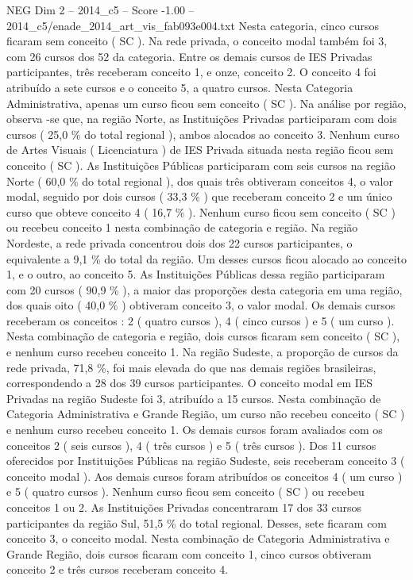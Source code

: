 \begin{textsample}{NEG Dim 2 – 2014\_c5 – Score -1.00 – 2014\_c5/enade\_2014\_art\_vis\_fab093e004.txt}
Nesta categoria, cinco cursos ficaram sem conceito ( SC ).
Na rede privada, o conceito modal também foi 3, com 26 cursos dos 52 da categoria.
Entre os demais cursos de IES Privadas participantes, três receberam conceito 1, e onze, conceito 2.
O conceito 4 foi atribuído a sete cursos e o conceito 5, a quatro cursos.
Nesta Categoria Administrativa, apenas um curso ficou sem conceito ( SC ).
Na análise por região, observa -se que, na região Norte, as Instituições Privadas participaram com dois cursos ( 25,0 \% do total regional ), ambos alocados ao conceito 3.
Nenhum curso de Artes Visuais ( Licenciatura ) de IES Privada situada nesta região ficou sem conceito ( SC ).
As Instituições Públicas participaram com seis cursos na região Norte ( 60,0 \% do total regional ), dos quais três obtiveram conceitos 4, o valor modal, seguido por dois cursos ( 33,3 \% ) que receberam conceito 2 e um único curso que obteve conceito 4 ( 16,7 \% ).
Nenhum curso ficou sem conceito ( SC ) ou recebeu conceito 1 nesta combinação de categoria e região.
Na região Nordeste, a rede privada concentrou dois dos 22 cursos participantes, o equivalente a 9,1 \% do total da região.
Um desses cursos ficou alocado ao conceito 1, e o outro, ao conceito 5.
As Instituições Públicas dessa região participaram com 20 cursos ( 90,9 \% ), a maior das proporções desta categoria em uma região, dos quais oito ( 40,0 \% ) obtiveram conceito 3, o valor modal.
Os demais cursos receberam os conceitos : 2 ( quatro cursos ), 4 ( cinco cursos ) e 5 ( um curso ).
Nesta combinação de categoria e região, dois cursos ficaram sem conceito ( SC ), e nenhum curso recebeu conceito 1.
Na região Sudeste, a proporção de cursos da rede privada, 71,8 \%, foi mais elevada do que nas demais regiões brasileiras, correspondendo a 28 dos 39 cursos participantes.
O conceito modal em IES Privadas na região Sudeste foi 3, atribuído a 15 cursos.
Nesta combinação de Categoria Administrativa e Grande Região, um curso não recebeu conceito ( SC ) e nenhum curso recebeu conceito 1.
Os demais cursos foram avaliados com os conceitos 2 ( seis cursos ), 4 ( três cursos ) e 5 ( três cursos ).
Dos 11 cursos oferecidos por Instituições Públicas na região Sudeste, seis receberam conceito 3 ( conceito modal ).
Aos demais cursos foram atribuídos os conceitos 4 ( um curso ) e 5 ( quatro cursos ).
Nenhum curso ficou sem conceito ( SC ) ou recebeu conceitos 1 ou 2.
As Instituições Privadas concentraram 17 dos 33 cursos participantes da região Sul, 51,5 \% do total regional.
Desses, sete ficaram com conceito 3, o conceito modal.
Nesta combinação de Categoria Administrativa e Grande Região, dois cursos ficaram com conceito 1, cinco cursos obtiveram conceito 2 e três cursos receberam conceito 4.

\end{textsample}
